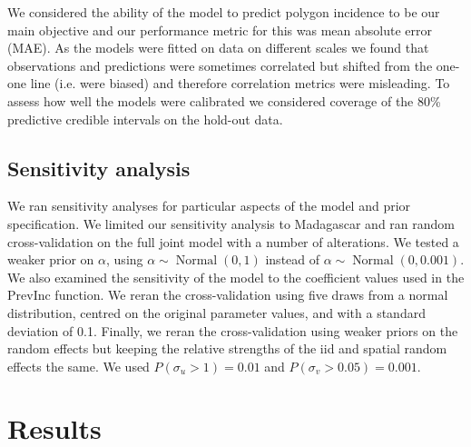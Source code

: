 \documentclass{statsoc}
\begin{document}
We considered the ability of the model to predict polygon incidence to be our main objective and our performance metric for this was mean absolute error (MAE).
As the models were fitted on data on different scales we found that observations and predictions were sometimes correlated but shifted from the one-one line (i.e. were biased) and therefore correlation metrics were misleading.
To assess how well the models were calibrated we considered coverage of the 80\% predictive credible intervals on the hold-out data.


\subsection*{Sensitivity analysis}

We ran sensitivity analyses for particular aspects of the model and prior specification.
We limited our sensitivity analysis to Madagascar and ran random cross-validation on the full joint model with a number of alterations.
We tested a weaker prior on $\alpha$, using $\alpha \sim \operatorname{Normal}(0, 1)$ instead of $\alpha \sim \operatorname{Normal}(0, 0.001)$.
We also examined the sensitivity of the model to the coefficient values used in the PrevInc function. 
We reran the cross-validation using five draws from a normal distribution, centred on the original parameter values, and with a standard deviation of 0.1.
Finally, we reran the cross-validation using weaker priors on the random effects but keeping the relative strengths of the iid and spatial random effects the same.
We used $P(\sigma_u > 1) = 0.01$ and $P(\sigma_v > 0.05) = 0.001$.




\section*{Results}

\end{document}

